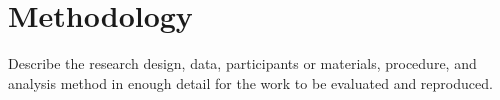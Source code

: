 \chapter{Methodology}

Describe the research design, data, participants or materials, procedure, and
analysis method in enough detail for the work to be evaluated and reproduced.
